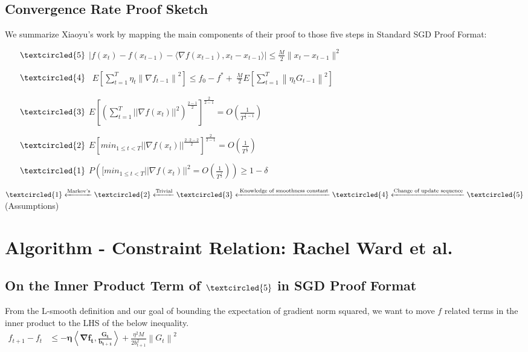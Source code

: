 \documentclass[14pt,onecolumn,letterpaper]{extarticle}
\begin{document}
\subsection{Convergence Rate Proof Sketch}
We summarize Xiaoyu's work
 by mapping the main components of their proof to those five steps in Standard SGD Proof Format:\\
\begin{enumerate}
    \item [$\textcircled{5}$] $|f(x_t)-f(x_{t-1})-\langle\nabla f(x_{t-1}), x_t-x_{t-1}\rangle| \leq \frac{M}{2}\|x_t-x_{t-1}\|^2$\\
    \item [$\textcircled{4}$] $\begin{aligned} E\left[\sum_{t=1}^T \eta_t\left\|\nabla f_{t-1}\right\|^2\right] \leq f_{0}-f^* +\ \frac{M}{2} 
    E\left[\sum_{t=1}^T\left\|\eta_t G_{t-1}\right\|^2\right]\end{aligned}$\\
    \item [$\textcircled{3}$] 
    $E\left[\left(\sum_{t=1}^{T}||\nabla f(x_t)||^2\right)^{\frac{2-1}{2}}\right]^{\frac{2}{2-1}}
    = O(\frac{1}{T^{\frac{1}{2} - 1}})$
    \item [$\textcircled{2}$] $E[min_{1 \leq t < T}||\nabla f(x_t)||^{\frac{2\cdot 2-2}{2}}]^{\frac{2}{2-1}} = O(\frac{1}{T^{\frac{1}{2}}})$
    \item [$\textcircled{1}$] $P([min_{1 \leq t < T}||\nabla f(x_t)||^2 = O(\frac{1}{T^\frac{1
    }{2}})) \geq 1 - \delta$\\\par
\end{enumerate} \par
$\textcircled{1} \xleftarrow{\text{Markov's}} \textcircled{2} \xleftarrow{\text{Trivial}} \textcircled{3} \xleftarrow{\text{ Knowledge of smoothness constant}} \textcircled{4} \xleftarrow{\text{Change of update sequence}} \textcircled{5}$(Assumptions)
\section{Algorithm - Constraint Relation: Rachel Ward et al.}
\subsection{On the Inner Product Term of $\textcircled{5}$ in SGD Proof Format}
From the L-smooth definition and our goal of bounding the expectation of gradient norm squared, we want to move $f$ related terms in the inner product to the LHS of the below inequality.\\
    $\begin{aligned} f_{t+1}-f_t & \leq\boldsymbol{-\eta\left\langle\nabla f_t, \frac{G_t}{b_{t+1}}\right\rangle}+\frac{\eta^2 M}{2 b_{t+1}^2}\left\|G_t\right\|^2 \end{aligned}$
    
\end{document}
